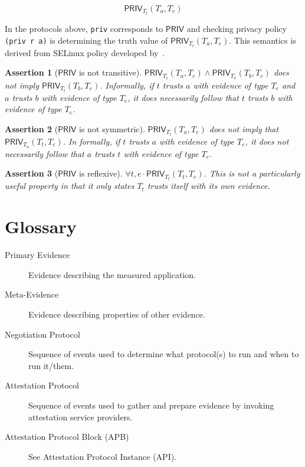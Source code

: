 \documentclass[10pt]{article}
\newtheorem{assertion}{Assertion}
\begin{document}
\[\mathsf{PRIV}_{T_t}(T_a,T_e)\]

In the protocols above, \Verb+priv+ corresponds to $\mathsf{PRIV}$ and
checking privacy policy \Verb+(priv r a)+ is determining the truth
value of $\mathsf{PRIV}_{T_t}(T_a,T_e)$.  This semantics is derived
from SELinux policy developed by~\citet{Hicks:07:A-logical-speci}.




\begin{assertion}[$\mathsf{PRIV}$ is not transitive]
  $\mathsf{PRIV}_{T_t}(T_a,T_e)\wedge\mathsf{PRIV}_{T_a}(T_b,T_e)$ does
  not imply $\mathsf{PRIV}_{T_t}(T_b,T_e)$.  Informally, if $t$ trusts
  $a$ with evidence of type $T_e$ and $a$ trusts $b$ with evidence of
  type $T_e$, it does necessarily follow that $t$ trusts $b$ with
  evidence of type $T_e$.
\end{assertion}

\begin{assertion}[$\mathsf{PRIV}$ is not symmetric]
  $\mathsf{PRIV}_{T_t}(T_a,T_e)$ does not imply that
  $\mathsf{PRIV}_{T_a}(T_t,T_e)$.  In formally, if $t$ trusts $a$ with
  evidence of type $T_e$, it does not necessarily follow that $a$
  trusts $t$ with evidence of type $T_e$.
\end{assertion}

\begin{assertion}[$\mathsf{PRIV}$ is reflexive]
  $\forall t,e\cdot\mathsf{PRIV}_{T_t}(T_t,T_e)$. This is not a
  particularly useful property in that it only states $T_t$ trusts
  itself with its own evidence.
\end{assertion}

\appendix

\section*{Glossary}

\begin{description}
\item[Primary Evidence] Evidence describing the measured application.
\item[Meta-Evidence] Evidence describing properties of other evidence.
\item[Negotiation Protocol] Sequence of events used to determine what
  protocol(s) to run and when to run it/them.
\item[Attestation Protocol] Sequence of events used to gather and
  prepare evidence by invoking attestation service providers.
\item[Attestation Protocol Block (APB)] See Attestation Protocol
  Instance (API).
\end{description}
\end{document}
